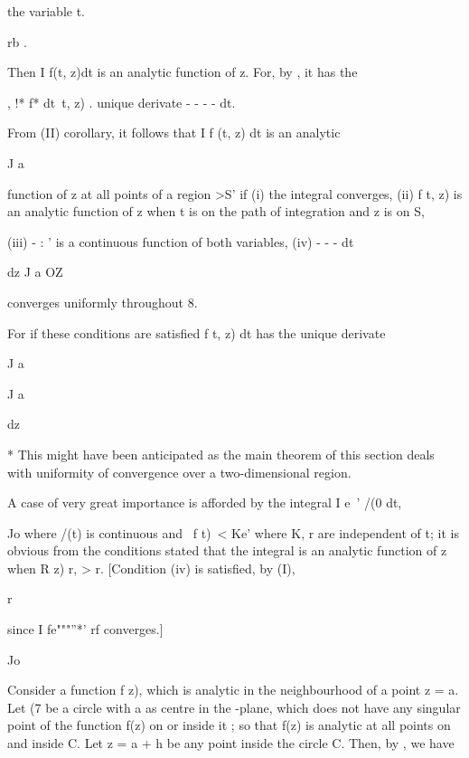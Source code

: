 {{the variable t.

rb .

Then I f(t, z)dt is an analytic function of z. For, by , it has
the

, !* f* dt\ t, z) . unique derivate - - - - dt.


From  (II) corollary, it follows that I f (t, z) dt is an
analytic

J a

function of z at all points of a region >S' if (i) the integral
converges, (ii) f t, z) is an analytic function of z when t is on the
path of integration and z is on S,

(iii) - : ' is a continuous function of both variables, (iv) - - - dt

dz J a OZ

converges uniformly throughout 8.

For if these conditions are satisfied f t, z) dt has the unique
derivate

J a

J a

dz

* This might have been anticipated as the main theorem of this section
deals with uniformity of convergence over a two-dimensional region.

%
%

A case of very great importance is afforded by the integral I e~' /(0
dt,

Jo where /(t) is continuous and \ f t)\ < Ke' where K, r are
independent of t; it is obvious from the conditions stated that the
integral is an analytic function of z when R z) r, > r. [Condition
(iv) is satisfied, by  (I),

r

since I fe"""''*' rf converges.]

Jo


Consider a function f z), which is analytic in the neighbourhood of a
point z = a. Let (7 be a circle with a as centre in the -plane, which
does not have any singular point of the function f(z) on or inside it
; so that f(z) is analytic at all points on and inside C. Let z = a +
h be any point inside the circle C. Then, by , we have

}}
